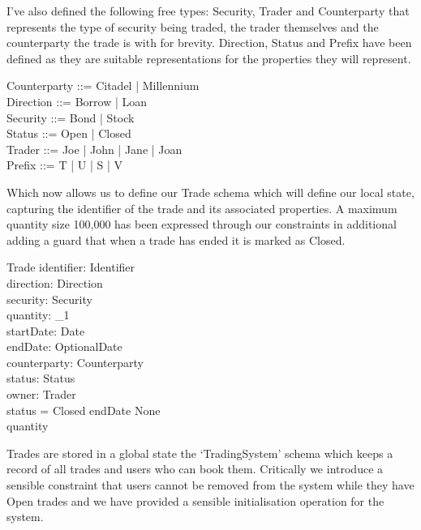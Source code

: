 \documentclass{article}
\begin{document}
\hspace{-0.62cm} I've also defined the following free types: Security, Trader and Counterparty that represents the type of security being traded, the trader themselves and the counterparty the trade is with for brevity.  Direction, Status and Prefix have been defined as they are suitable representations for the properties they will represent.

\begin{zed}
Counterparty ::= Citadel | Millennium  \\
Direction ::= Borrow | Loan \\
Security ::= Bond | Stock \\
Status ::= Open | Closed \\  
Trader ::= Joe | John | Jane | Joan \\
Prefix ::= T | U | S | V \\
\end{zed}

\hspace{-0.62cm} Which now allows us to define our Trade schema which will define our local state, capturing the identifier of the trade and its associated properties. A maximum quantity size 100,000 has been expressed through our constraints in additional adding a guard that when a trade has ended it is marked as Closed. 

\begin{schema}{Trade}
identifier: Identifier \\
direction: Direction \\ 
security: Security \\
quantity: \nat_1 \\
startDate: Date \\
endDate: OptionalDate \\ 
counterparty: Counterparty \\
status: Status \\
owner: Trader \\
\where
status = Closed \iff endDate \neq None \\
quantity  \\
\end{schema}

\hspace{-0.7cm} Trades are stored in a global state the ‘TradingSystem’ schema which keeps a record of all trades and users who can book them. Critically we introduce a sensible constraint that users cannot be removed from the system while they have Open trades and we have provided a sensible initialisation operation for the system.
\end{document}
